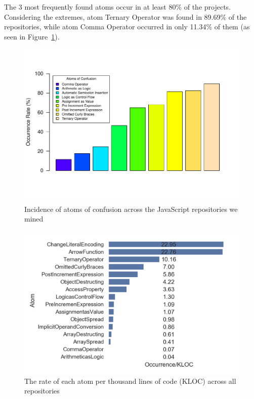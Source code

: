 The 3 most frequently found atoms occur in at least 80\% of the projects.
Considering the extremes, atom Ternary Operator was found in 89.69\% of the repositories, while atom Comma Operator occurred in only 11.34\% of them (as seen in Figure~\ref{fig:rate}).




\begin{figure}
    \centering
    \includegraphics[width=\columnwidth]{images/rate-1.pdf}
    \caption{Incidence of atoms of confusion across the \minedprojects JavaScript repositories we mined}
    \label{fig:rate}
\end{figure}

\begin{figure}
    \centering
    \includegraphics[width=\columnwidth]{images/chart_ocurrence_kloc.png}
    \caption{The rate of each atom per thousand lines of code (KLOC) across all \minedprojects repositories}
    \label{fig:atoms-occurrence}
\end{figure}


